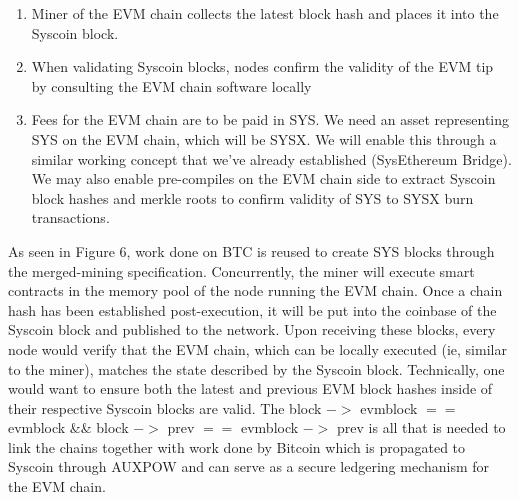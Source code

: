 \documentclass[peerreview]{ieeesyscoin}
\begin{document}
\begin{enumerate}
\item Miner of the EVM chain collects the latest block hash and places it into the Syscoin block.
\item When validating Syscoin blocks, nodes confirm the validity of the EVM tip by consulting the EVM chain software locally
\item Fees for the EVM chain are to be paid in SYS. We need an asset representing SYS on the EVM chain, which will be SYSX. We will enable this through a similar working concept that we’ve already established (SysEthereum Bridge). We may also enable pre-compiles on the EVM chain side to extract Syscoin block hashes and merkle roots to confirm validity of SYS to SYSX burn transactions.
\end{enumerate}

As seen in Figure 6, work done on BTC is reused to create SYS blocks through the merged-mining specification. Concurrently, the miner will execute smart contracts in the memory pool of the node running the EVM chain. Once a chain hash has been established post-execution, it will be put into the coinbase of the Syscoin block and published to the network. Upon receiving these blocks, every node would verify that the EVM chain, which can be locally executed (ie, similar to the miner), matches the state described by the Syscoin block. Technically, one would want to ensure both the latest and previous EVM block hashes inside of their respective Syscoin blocks are valid. The block $->$ evmblock $==$ evmblock \&\& block $->$ prev $==$ evmblock $->$ prev is all that is needed to link the chains together with work done by Bitcoin which is propagated to Syscoin through AUXPOW and can serve as a secure ledgering mechanism for the EVM chain.
\end{document}
